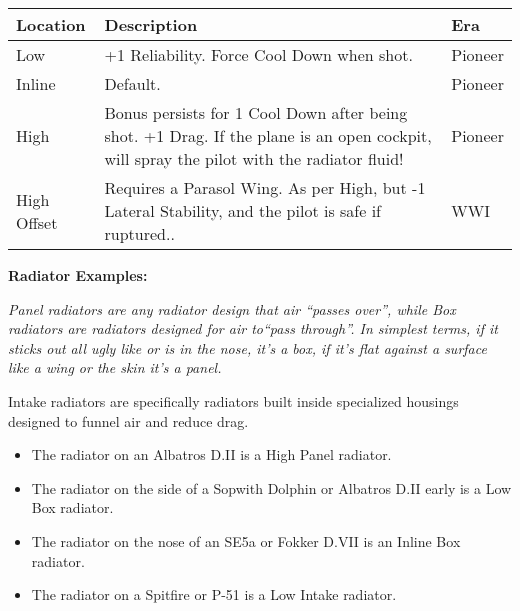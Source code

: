 \documentclass{article}
\begin{document}
\begin{tabular}{|l|l|l|}
  \hline
  Location                                       & Description                                                      & Era     \\\hline
  Low                                            & +1 Reliability. Force Cool Down when shot.                       & Pioneer \\\hline
  Inline                                         & Default.                                                         & Pioneer \\\hline
  High                                           & Bonus persists for 1 Cool Down after being shot. +1 Drag. If the
  plane is an open cockpit, will spray the pilot with the radiator fluid!
                                                 & Pioneer                                                                    \\\hline
  High Offset                                    & Requires a Parasol Wing. As per High, but -1 Lateral
  Stability, and the pilot is safe if ruptured.. & WWI                                                                        \\\hline
\end{tabular}

\textbf{Radiator Examples: }

\emph{Panel radiators are any radiator design that air
  ``passes over'', while Box radiators are
  radiators designed for air to``pass
  through''. In simplest terms, if it sticks out all ugly
  like or is in the nose, it's a box, if
  it's flat against a surface like a wing
  or the skin it's a panel.}

Intake radiators are specifically radiators built inside
specialized housings designed to funnel air and reduce drag.

\begin{itemize}
  \item          The radiator on an Albatros D.II is a High Panel radiator.
  \item          The radiator on the side of a Sopwith Dolphin or Albatros D.II
        early is a Low Box radiator.
  \item          The radiator on the nose of an SE5a or Fokker D.VII is an
        Inline Box radiator.
  \item          The radiator on a Spitfire or P-51 is a Low Intake radiator.
\end{itemize}
\end{document}

